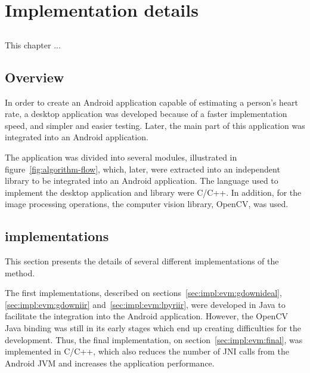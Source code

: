 \chapter{Implementation details} \label{chap:impl}

\section*{}


This chapter ...

\section{Overview} \label{sec:sol:overview}


In order to create an Android application capable of estimating a person's
heart rate, a desktop application was developed because of a faster
implementation speed, and simpler and easier testing. Later, the main part
of this application was integrated into an Android application.

The application was divided into several modules, illustrated in
figure~\ref{fig:algorithm-flow}, which, later, were extracted into an
independent library to be integrated into an Android application.
The language used to implement the desktop application and library
were C/C++. In addition, for the image processing operations, the
computer vision library, OpenCV, was used.


\section{\evm{} implementations} \label{sec:impl:evm}


This section presents the details of several different implementations of the
\evm{} method.

The first implementations, described on sections~\ref{sec:impl:evm:gdownideal},
\ref{sec:impl:evm:gdowniir} and~\ref{sec:impl:evm:lpyriir},
were developed in Java to facilitate the integration into the Android
application. However, the OpenCV Java binding was still in its early stages
which end up creating difficulties for the development. Thus, the final
implementation, on section~\ref{sec:impl:evm:final}, was implemented in C/C++,
which also reduces the number of JNI calls from the Android JVM and
increases the application performance.


